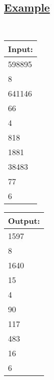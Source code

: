 \documentclass[12pt]{article}
\begin{document}
\subsection*{\underline{Example}}
\begin{center}\tt
 \begin{tabular}{|l|}
\hline
Input: \\
\hline
598895\\
8\\
641146\\
66\\
4\\
818\\
1881\\ 
38483\\
77\\
6\\
\hline
\end{tabular}\qquad\qquad
 \begin{tabular}{|l|}
\hline
Output: \\
\hline
1597\\
8\\
1640\\
15\\
4\\
90\\
117\\
 483\\
16\\
6\\
\hline
 \end{tabular}
\end{center}
\end{document}
